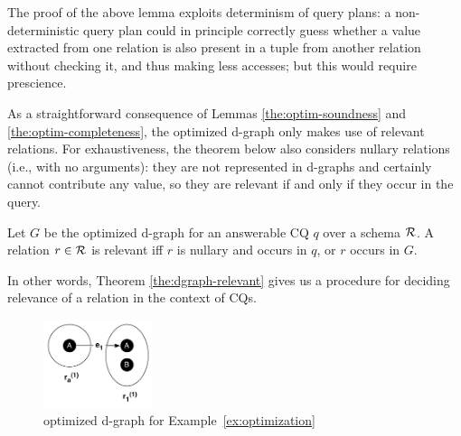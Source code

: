 
The proof of the above lemma exploits determinism of query plans: a non-deterministic query plan could in principle correctly guess whether a value extracted from one relation is also present in a tuple from another relation without checking it, and thus making less accesses; but this would require prescience.

As a straightforward consequence of Lemmas \ref{the:optim-soundness} and \ref{the:optim-completeness}, the optimized d-graph only makes use of relevant relations.
%
For exhaustiveness, the theorem below also considers nullary relations (i.e., with no arguments): they are not represented in d-graphs and certainly cannot contribute any value, so they are relevant if and only if they occur in the query.
\begin{theorem}\label{the:dgraph-relevant}
  Let $G$ be the optimized d-graph for an answerable CQ $q$ over a schema $\mathcal{R}$.
  A relation $r\in\mathcal{R}$ is relevant iff
  \myi $r$ is nullary and occurs in $q$, or
  \myii $r$ occurs in $G$.
\end{theorem}
%
In other words, Theorem \ref{the:dgraph-relevant} gives us a procedure for deciding relevance of a relation in the context of CQs.

\begin{figure}[t]
  \centering
  \includegraphics[width=3.2cm]{optimized0.pdf}
  \caption{optimized d-graph for Example~\ref{ex:optimization}}
  \label{fig:optimized}
\end{figure}

